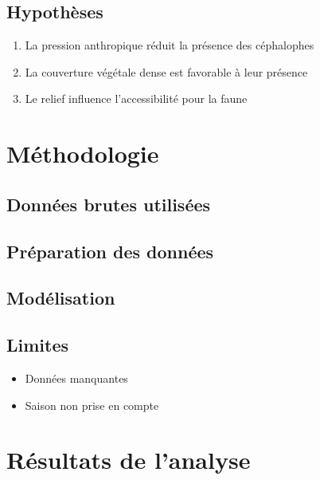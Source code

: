 \documentclass[
]{article}
\providecommand{\tightlist}{%
  \setlength{\itemsep}{0pt}\setlength{\parskip}{0pt}}
\begin{document}
\subsection{Hypothèses}\label{hypothuxe8ses}

\begin{enumerate}
\def\labelenumi{\arabic{enumi}.}
\tightlist
\item
  La pression anthropique réduit la présence des céphalophes
\item
  La couverture végétale dense est favorable à leur présence
\item
  Le relief influence l'accessibilité pour la faune
\end{enumerate}

\section{Méthodologie}\label{muxe9thodologie}

\subsection{Données brutes utilisées}\label{donnuxe9es-brutes-utilisuxe9es}

\subsection{Préparation des données}\label{pruxe9paration-des-donnuxe9es}

\subsection{Modélisation}\label{moduxe9lisation}

\subsection{Limites}\label{limites}

\begin{itemize}
\tightlist
\item
  Données manquantes
\item
  Saison non prise en compte
\end{itemize}

\section{Résultats de l'analyse}\label{ruxe9sultats-de-lanalyse}
\end{document}
